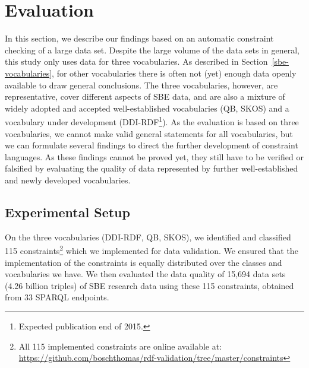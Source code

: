 \documentclass[conference]{IEEEtran}
\newcommand{\ke}[1]{\todo[size=\small, color=red!40]{\textbf{Kai:} #1}}
\begin{document}
\section{Evaluation}
\label{evaluation}

In this section, we describe our findings based on an automatic constraint checking of a large data set. Despite the large volume of the data sets in general, this study only uses data for three vocabularies. As described in Section~\ref{sbe-vocabularies}, for other vocabularies there is often not (yet) enough data openly available to draw general conclusions. The three vocabularies, however, are representative, cover different aspects of SBE data, and are also a mixture of widely adopted and accepted well-established vocabularies (QB, SKOS) and a vocabulary under development (DDI-RDF\footnote{Expected publication end of 2015.}). 
As the evaluation is based on three vocabularies, 
we cannot make valid general statements for all vocabularies,
but we can formulate several findings to direct the further development of constraint languages.
As these findings cannot be proved yet, 
they still have to be verified or falsified
by evaluating the quality of data represented by further well-established and newly developed vocabularies.

\subsection{Experimental Setup}
\label{implementation}


On the three vocabularies (DDI-RDF, QB, SKOS), we identified and classified 115 constraints\footnote{All 115 implemented constraints are online available at: \url{https://github.com/boschthomas/rdf-validation/tree/master/constraints}} which we implemented for data validation. We ensured that the implementation of the constraints is equally distributed over the classes and vocabularies we have. We then evaluated the data quality of 15,694 data sets (4.26 billion triples) of SBE research data using these 115 constraints, obtained from 33 SPARQL endpoints.
\end{document}
